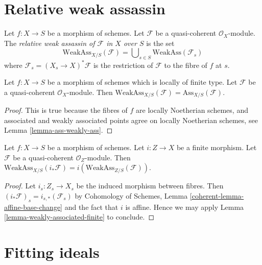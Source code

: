 \section{Relative weak assassin}
\label{section-relative-weak-assassin}

\begin{definition}
\label{definition-relative-weak-assassin}
Let $f : X \to S$ be a morphism of schemes.
Let $\mathcal{F}$ be a quasi-coherent $\mathcal{O}_X$-module.
The {\it relative weak assassin of $\mathcal{F}$ in $X$ over $S$}
is the set
$$
\text{WeakAss}_{X/S}(\mathcal{F}) =
\bigcup\nolimits_{s \in S} \text{WeakAss}(\mathcal{F}_s)
$$
where $\mathcal{F}_s = (X_s \to X)^*\mathcal{F}$ is the restriction
of $\mathcal{F}$ to the fibre of $f$ at $s$.
\end{definition}

\begin{lemma}
\label{lemma-relative-weak-assassin-assassin-finite-type}
Let $f : X \to S$ be a morphism of schemes which is locally of finite type.
Let $\mathcal{F}$ be a quasi-coherent $\mathcal{O}_X$-module.
Then $\text{WeakAss}_{X/S}(\mathcal{F}) = \text{Ass}_{X/S}(\mathcal{F})$.
\end{lemma}

\begin{proof}
This is true because the fibres of $f$ are locally Noetherian schemes,
and associated and weakly associated points agree on locally Noetherian
schemes, see
Lemma \ref{lemma-ass-weakly-ass}.
\end{proof}

\begin{lemma}
\label{lemma-relative-weak-assassin-finite}
Let $f : X \to S$ be a morphism of schemes.
Let $i : Z \to X$ be a finite morphism.
Let $\mathcal{F}$ be a quasi-coherent $\mathcal{O}_Z$-module.
Then $\text{WeakAss}_{X/S}(i_*\mathcal{F}) =
i(\text{WeakAss}_{Z/S}(\mathcal{F}))$.
\end{lemma}

\begin{proof}
Let $i_s : Z_s \to X_s$ be the induced morphism between fibres.
Then $(i_*\mathcal{F})_s = i_{s, *}(\mathcal{F}_s)$ by
Cohomology of Schemes, Lemma \ref{coherent-lemma-affine-base-change}
and the fact that $i$ is affine. Hence
we may apply Lemma \ref{lemma-weakly-associated-finite} to conclude.
\end{proof}





\section{Fitting ideals}
\label{section-fitting-ideals}

